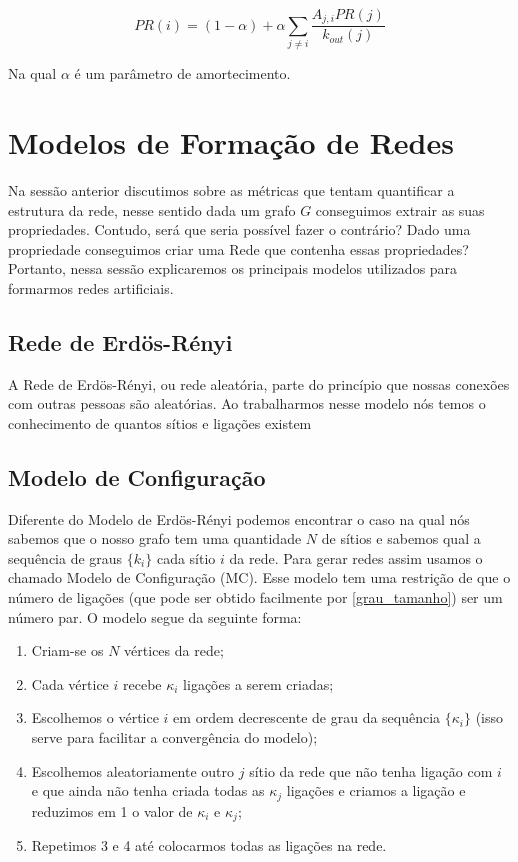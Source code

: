 \begin{equation}
  PR(i) = (1 - \alpha) + \alpha\sum_{j \neq i}\frac{A_{j,i}PR(j)}{k_{out}(j)}
\end{equation}

Na qual $\alpha$ é um parâmetro de amortecimento.

\section{Modelos de Formação de Redes}

Na sessão anterior discutimos sobre as métricas que tentam quantificar a estrutura da rede, nesse sentido dada um grafo $G$ conseguimos extrair as suas propriedades. Contudo, será que seria possível fazer o contrário? Dado uma propriedade conseguimos criar uma Rede que contenha essas propriedades? Portanto, nessa sessão explicaremos os principais modelos utilizados para formarmos redes artificiais.

\subsection{Rede de Erdös-Rényi}

A Rede de Erdös-Rényi, ou rede aleatória, parte do princípio que nossas conexões com outras pessoas são aleatórias. Ao trabalharmos nesse modelo nós temos o conhecimento de quantos sítios e ligações existem

\subsection{Modelo de Configuração}

Diferente do Modelo de Erdös-Rényi podemos encontrar o caso na qual nós sabemos que o nosso grafo tem uma quantidade $N$ de sítios e sabemos qual a sequência de graus $\{k_i\}$ cada sítio $i$ da rede. Para gerar redes assim usamos o chamado Modelo de Configuração (MC). Esse modelo tem uma restrição de que o número de ligações (que pode ser obtido facilmente por \ref{grau_tamanho}) ser um número par. O modelo segue da seguinte forma:

\begin{enumerate}
  \item Criam-se os $N$ vértices da rede;
  \item Cada vértice $i$ recebe $\kappa_i$ ligações a serem criadas;
  \item Escolhemos o vértice $i$ em ordem decrescente de grau da sequência $\{\kappa_i\}$ (isso serve para facilitar a convergência do modelo);
  \item Escolhemos aleatoriamente outro $j$ sítio da rede que não tenha ligação com $i$ e que ainda não tenha criada todas as $\kappa_j$ ligações e criamos a ligação e reduzimos em 1 o valor de $\kappa_i$ e $\kappa_j$;
  \item Repetimos 3 e 4 até colocarmos todas as ligações na rede.
\end{enumerate}

